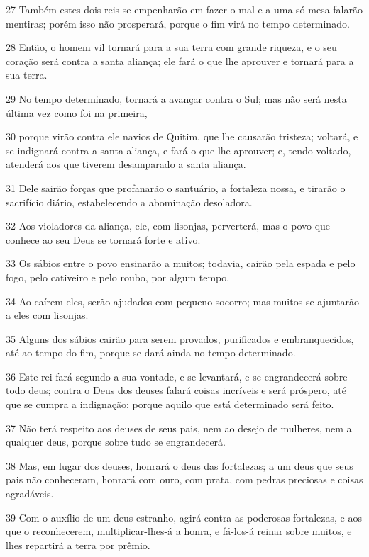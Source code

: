 \par 27 Também estes dois reis se empenharão em fazer o mal e a uma só mesa falarão mentiras; porém isso não prosperará, porque o fim virá no tempo determinado.
\par 28 Então, o homem vil tornará para a sua terra com grande riqueza, e o seu coração será contra a santa aliança; ele fará o que lhe aprouver e tornará para a sua terra.
\par 29 No tempo determinado, tornará a avançar contra o Sul; mas não será nesta última vez como foi na primeira,
\par 30 porque virão contra ele navios de Quitim, que lhe causarão tristeza; voltará, e se indignará contra a santa aliança, e fará o que lhe aprouver; e, tendo voltado, atenderá aos que tiverem desamparado a santa aliança.
\par 31 Dele sairão forças que profanarão o santuário, a fortaleza nossa, e tirarão o sacrifício diário, estabelecendo a abominação desoladora.
\par 32 Aos violadores da aliança, ele, com lisonjas, perverterá, mas o povo que conhece ao seu Deus se tornará forte e ativo.
\par 33 Os sábios entre o povo ensinarão a muitos; todavia, cairão pela espada e pelo fogo, pelo cativeiro e pelo roubo, por algum tempo.
\par 34 Ao caírem eles, serão ajudados com pequeno socorro; mas muitos se ajuntarão a eles com lisonjas.
\par 35 Alguns dos sábios cairão para serem provados, purificados e embranquecidos, até ao tempo do fim, porque se dará ainda no tempo determinado.
\par 36 Este rei fará segundo a sua vontade, e se levantará, e se engrandecerá sobre todo deus; contra o Deus dos deuses falará coisas incríveis e será próspero, até que se cumpra a indignação; porque aquilo que está determinado será feito.
\par 37 Não terá respeito aos deuses de seus pais, nem ao desejo de mulheres, nem a qualquer deus, porque sobre tudo se engrandecerá.
\par 38 Mas, em lugar dos deuses, honrará o deus das fortalezas; a um deus que seus pais não conheceram, honrará com ouro, com prata, com pedras preciosas e coisas agradáveis.
\par 39 Com o auxílio de um deus estranho, agirá contra as poderosas fortalezas, e aos que o reconhecerem, multiplicar-lhes-á a honra, e fá-los-á reinar sobre muitos, e lhes repartirá a terra por prêmio.
